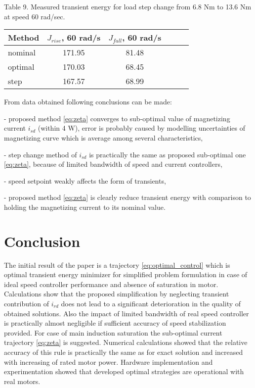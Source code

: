 \documentclass[journal]{IEEEtran}
\begin{document}
\begin{center}
Table 9.
Measured transient energy for load step change from 6.8 Nm to 13.6 Nm at speed 60 rad/sec.

\begin{tabular}{ | l | c | c | c | c | c | }
\hline 
Method & $J_{rise}$, 60 rad/s & $J_{fall}$, 60 rad/s \\
\hline 
nominal & 171.95  & 81.48   \\
optimal & 170.03  & 68.45  \\
step & 167.57  & 68.99   \\
\hline 
\end{tabular}

\end{center}


From data obtained following conclusions can be made:

- proposed method \eqref{eq:zeta} converges to sub-optimal value of magnetizing current $i_{sd}$ (within 4 W), error is probably caused by modelling uncertainties of magnetizing curve which is average among several characteristics,

- step change method of $i_{sd}$ is practically the same as proposed sub-optimal one \eqref{eq:zeta}, because of limited bandwidth of speed and current controllers,

- speed setpoint weakly affects the form of transients,

- proposed method \eqref{eq:zeta} is clearly reduce transient energy with comparison to holding the magnetizing current to its nominal value.

\section*{Conclusion}

The initial result of the paper is a trajectory \eqref{eq:optimal_control} which is optimal transient energy minimizer for simplified problem formulation in case of ideal speed controller performance and absence of saturation in motor. Calculations show that the proposed simplification by neglecting transient contribution of $i_{rd}$ does not lead to a significant deterioration in the quality of obtained solutions.
Also the impact of limited bandwidth of real speed controller is practically almost negligible if sufficient accuracy of speed stabilization provided. For case of main induction saturation the sub-optimal current trajectory \eqref{eq:zeta} is suggested. Numerical calculations showed that the relative accuracy of this rule is practically the same as for exact solution and increased with increasing of rated motor power. Hardware implementation and experimentation showed that developed optimal strategies are operational with real motors.
\end{document}
